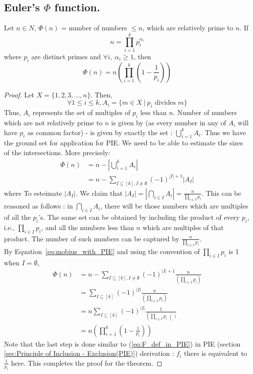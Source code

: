 \subsection{Euler's $\Phi$ function.} \label{subsec:euler's function application}
\begin{theorem}
Let $n \in N$, $\Phi (n)$ = number of numbers $\leq n$, which are relatively prime to $n$. If $$n=\prod_{i=1}^{k}p_i^{\alpha_i}$$ where $p_i$ are distinct primes and $\forall i,~ \alpha_i \geq 1$, then $$\Phi(n) = n \left(\prod_{i=1}^{k}\left(1-\frac{1}{p_i}\right) \right)$$
\end{theorem}
\begin{proof}
Let $X=\{1,2,3,...,n\}$. Then,
\[
\forall 1 \leq i \leq k, A_i = \{m\in X ~|~p_i \textrm{ divides } m\}
\]
Thus, $A_i$ represents the set of multiples of $p_i$ less than $n$.
Number of numbers which are not relatively prime to $n$ is given by (as every number in any of $A_i$ will have $p_i$ as common factor) - is given by exactly the set : $\bigcup_{i=1}^{k} A_i$.  Thus we have the ground set for application for PIE. We need to be able to estimate the sizes of the intersections. More precisely:
\begin{align}
\Phi (n) &= n - |\bigcup_{i=1}^{k}A_i| \tag{apply PIE}
\nonumber \\
&=n- \sum_{I \subseteq [k], I \neq \emptyset} (-1)^{|I|+1}|A_I| \label{eq:mobius_with_PIE}
\end{align}
where
To esteimate $|A_I|$. We claim that $|A_I| = |\bigcap_{i \in I}A_i| = \frac{n}{\prod_{i \in I}p_i}$. This can be reasoned as follows : in $\bigcap_{i \in I}A_i$, there will be those numbers which are multiples of all the $p_i$'s. The same set can be obtained by including the product of every $p_i$, i.e., $\prod_{i \in I}p_i$, and all the numbers less than $n$ which are multiples of that product. The number of such numbers can be captured by $\frac{n}{\prod_{i \in I}p_i}$.\\
By Equation~\ref{eq:mobius_with_PIE} and using the convention of $\prod_{i \in I}p_i$ is 1 when $I=\emptyset$, 
\begin{align*}
\Phi (n) &= n - \sum_{I \subseteq [k], I \neq \emptyset} (-1)^{|I|+1}\frac{n}{\left(\prod_{i \in I}p_i\right)}\\
&= \sum_{I \subseteq [k]} (-1)^{|I|}\frac{n}{(\prod_{i \in I}p_i)}\\
&= n\sum_{I \subseteq [k]} (-1)^{|I|}\frac{1}{\left(\prod_{i \in I}p_i\right()}\\
&=n\left(\prod_{i=1}^{k}\left(1-\frac{1}{p_i}\right)\right)
\end{align*}
Note that the last step is done similar to  (\ref{eq:F_def_in_PIE}) in PIE (section \ref{sec:Principle of Inclusion - Exclusion(PIE)}) derivation : $f_i$ there is equivalent to $\frac{1}{p_i}$ here. This completes the proof for the theorem.
\end{proof}
